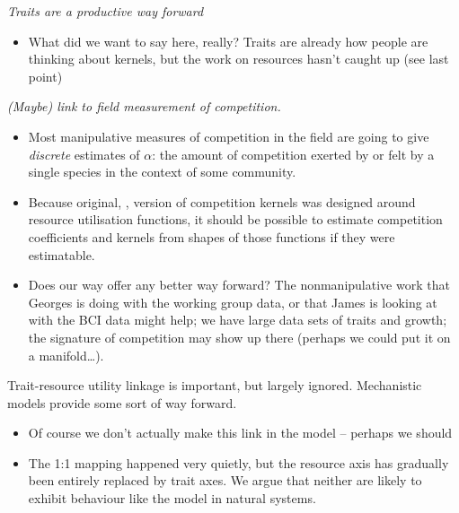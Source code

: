 \documentclass[a4paper,11pt]{article}
\begin{document}
\textit{Traits are a productive way forward}
\begin{itemize}
\item What did we want to say here, really?  Traits are already how
  people are thinking about kernels, but the work on resources hasn't
  caught up (see last point)
\end{itemize}

\textit{(Maybe) link to field measurement of competition.}
\begin{itemize}
\item Most manipulative measures of competition in the field are going
  to give \emph{discrete} estimates of $\alpha$: the amount of
  competition exerted by or felt by a single species in the context of
  some community.
\item Because original, \citet{MacArthur-1967}, version of competition
  kernels was designed around resource utilisation functions, it
  should be possible to estimate competition coefficients and kernels
  from shapes of those functions if they were estimatable.
\item Does our way offer any better way forward?  The nonmanipulative
  work that Georges is doing with the working group data, or that
  James is looking at with the BCI data might help; we have large data
  sets of traits and growth; the signature of competition may show up
  there (perhaps we could put it on a manifold\ldots).
\end{itemize}

Trait-resource utility linkage is important, but largely ignored.
Mechanistic models provide some sort of way forward.
\begin{itemize}
\item Of course we don't actually make this link in the model --
  perhaps we should
\item The 1:1 mapping happened very quietly, but the resource axis has
  gradually been entirely replaced by trait axes.  We argue that
  neither are likely to exhibit behaviour like the
  \citet{MacArthur-1967} model in natural systems.
\end{itemize}

\clearpage


\end{document}
